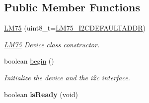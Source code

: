 \subsection*{Public Member Functions}
\begin{DoxyCompactItemize}
\item 
\hyperlink{class_l_m75_a2fd78a5cbd54b7e9906231a401fb1dfc}{L\-M75} (uint8\-\_\-t=\hyperlink{_l_m75_8h_ac48c7709cb57abee0e65802e2e34ed0a}{L\-M75\-\_\-\-I2\-C\-D\-E\-F\-A\-U\-L\-T\-A\-D\-D\-R})
\begin{DoxyCompactList}\small\item\em \hyperlink{class_l_m75}{L\-M75} Device class constructor. \end{DoxyCompactList}\item 
\hypertarget{class_l_m75_a7efa68c775573baab4bda3bc4d498be6}{boolean \hyperlink{class_l_m75_a7efa68c775573baab4bda3bc4d498be6}{begin} ()}\label{class_l_m75_a7efa68c775573baab4bda3bc4d498be6}

\begin{DoxyCompactList}\small\item\em Initialize the device and the i2c interface. \end{DoxyCompactList}\item 
\hypertarget{class_l_m75_af86db7f91e48b9bc7a08eb5b9310144c}{boolean {\bfseries is\-Ready} (void)}\label{class_l_m75_af86db7f91e48b9bc7a08eb5b9310144c}


\end{DoxyCompactItemize}
